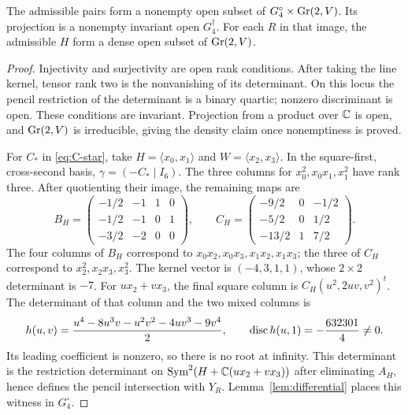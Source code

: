 \begin{lemma}\label{lem:good-open}
The admissible pairs form a nonempty open subset of
$G_4^\circ\times\operatorname{Gr}(2,V)$. Its projection is a nonempty invariant
open $G_4^\dagger$. For each $R$ in that image, the admissible $H$
form a dense open subset of $\operatorname{Gr}(2,V)$.
\end{lemma}
\begin{proof}
Injectivity and surjectivity are open rank conditions. After taking the
line kernel, tensor rank two is the nonvanishing of its determinant.
On this locus the pencil restriction of the determinant is a binary
quartic; nonzero discriminant is open. These conditions are invariant.
Projection from a product over $\mathbb C$ is open, and $\operatorname{Gr}(2,V)$ is
irreducible, giving the density claim once nonemptiness is proved.

For $C_*$ in \eqref{eq:C-star}, take $H=\langle x_0,x_1\rangle$ and
$W=\langle x_2,x_3\rangle$. In the square-first, cross-second basis,
$\gamma=(-C_*\mid I_6)$. The three columns for $x_0^2,x_0x_1,x_1^2$
have rank three. After quotienting their image, the remaining maps are
\begin{equation}\label{eq:BC-witness}
 B_H=\begin{pmatrix}-1/2&-1&1&0\\-1/2&-1&0&1\\-3/2&-2&0&0\end{pmatrix},
 \qquad
 C_H=\begin{pmatrix}-9/2&0&-1/2\\-5/2&0&1/2\\-13/2&1&7/2\end{pmatrix}.
\end{equation}
The four columns of $B_H$ correspond to
$x_0x_2,x_0x_3,x_1x_2,x_1x_3$; the three of $C_H$ correspond to
$x_2^2,x_2x_3,x_3^2$. The kernel vector is $(-4,3,1,1)$, whose
$2\times2$ determinant is $-7$. For $u x_2+v x_3$, the final square
column is $C_H(u^2,2uv,v^2)^t$. The determinant of that column and
the two mixed columns is
\begin{equation}\label{eq:h-witness}
 h(u,v)=\frac{u^4-8u^3v-u^2v^2-4uv^3-9v^4}{2},\qquad
 \operatorname{disc} h(u,1)=-\frac{632301}{4}\ne0.
\end{equation}
Its leading coefficient is nonzero, so there is no root at infinity.
This determinant is the restriction determinant on
$\operatorname{Sym}^2(H+\mathbb C(ux_2+vx_3))$ after eliminating $A_H$, hence defines the
pencil intersection with $Y_R$. Lemma~\ref{lem:differential} places
this witness in $G_4^\circ$.
\end{proof}

